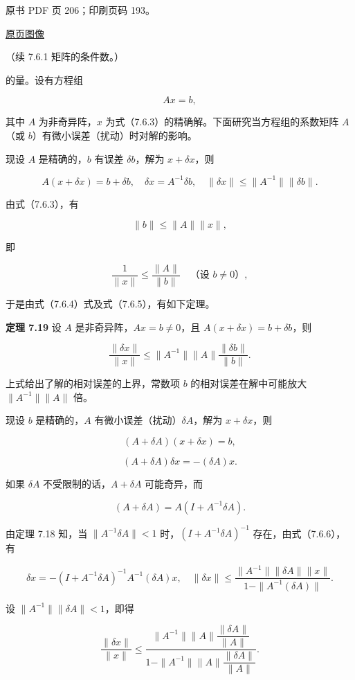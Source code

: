 \clearpage

原书 PDF 页 206；印刷页码 193。

\href{source-images/pdf-206.jpeg}{原页图像}

（续 7.6.1 矩阵的条件数。）

的量。设有方程组

\[
Ax=b,
\tag{7.6.3}
\]

其中 \(A\) 为非奇异阵，\(x\) 为式（7.6.3）的精确解。下面研究当方程组的系数矩阵 \(A\)（或 \(b\)）有微小误差（扰动）时对解的影响。

现设 \(A\) 是精确的，\(b\) 有误差 \(\delta b\)，解为 \(x+\delta x\)，则

\[
A(x+\delta x)=b+\delta b,\quad\delta x=A^{-1}\delta b,\quad\|\delta x\|\leqslant\|A^{-1}\|\|\delta b\|.
\tag{7.6.4}
\]

由式（7.6.3），有

\[
\|b\|\leqslant\|A\|\|x\|,
\]

即

\[
\frac1{\|x\|}\leqslant\frac{\|A\|}{\|b\|}\quad\text{（设 }b\neq0\text{）},
\tag{7.6.5}
\]

于是由式（7.6.4）式及式（7.6.5），有如下定理。

\textbf{定理 7.19} 设 \(A\) 是非奇异阵，\(Ax=b\neq0\)，且 \(A(x+\delta x)=b+\delta b\)，则

\[
\frac{\|\delta x\|}{\|x\|}\leqslant\|A^{-1}\|\|A\|\frac{\|\delta b\|}{\|b\|}.
\]

上式给出了解的相对误差的上界，常数项 \(b\) 的相对误差在解中可能放大 \(\|A^{-1}\|\|A\|\) 倍。

现设 \(b\) 是精确的，\(A\) 有微小误差（扰动）\(\delta A\)，解为 \(x+\delta x\)，则

\[
(A+\delta A)(x+\delta x)=b,
\]

\[
(A+\delta A)\delta x=-(\delta A)x.
\tag{7.6.6}
\]

如果 \(\delta A\) 不受限制的话，\(A+\delta A\) 可能奇异，而

\[
(A+\delta A)=A(I+A^{-1}\delta A).
\]

由定理 7.18 知，当 \(\|A^{-1}\delta A\|<1\) 时，\((I+A^{-1}\delta A)^{-1}\) 存在，由式（7.6.6），有

\[
\delta x=-(I+A^{-1}\delta A)^{-1}A^{-1}(\delta A)x,\quad
\|\delta x\|\leqslant\frac{\|A^{-1}\|\|\delta A\|\|x\|}{1-\|A^{-1}(\delta A)\|}.
\]

设 \(\|A^{-1}\|\|\delta A\|<1\)，即得

\[
\frac{\|\delta x\|}{\|x\|}
\leqslant
\frac{\|A^{-1}\|\|A\|\dfrac{\|\delta A\|}{\|A\|}}
{1-\|A^{-1}\|\|A\|\dfrac{\|\delta A\|}{\|A\|}}.
\tag{7.6.7}
\]

